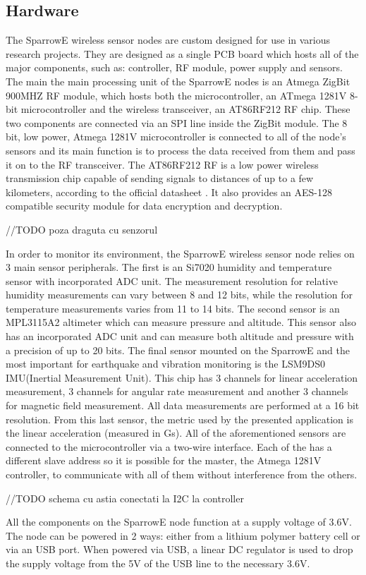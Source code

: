 \label{chap:arch}
\subsection{Hardware}

The SparrowE wireless sensor nodes are custom designed for use in various research projects.
They are designed as a single PCB board which hosts all of the major components, such as: controller,
RF module, power supply and sensors. The main the main processing unit of the SparrowE nodes is an Atmega 
ZigBit 900MHZ RF module, which hosts both the microcontroller, an ATmega 1281V 8-bit microcontroller and the 
wireless transceiver, an AT86RF212 RF chip. These two components are connected via an SPI line inside the ZigBit 
module. The 8 bit, low power, Atmega 1281V microcontroller is connected to all of the node's sensors and its 
main function is to process the data received from them and pass it on to the RF transceiver. The AT86RF212 RF 
is a low power wireless transmission chip capable of sending signals to distances of up to a few kilometers, according 
to the official datasheet \cite{datasheetatmel}. It also provides an AES-128 compatible security module for data 
encryption and decryption.

//TODO poza draguta cu senzorul

In order to monitor its environment, the SparrowE wireless sensor node relies on 3 main sensor peripherals. The first is 
an Si7020 humidity and temperature sensor with incorporated ADC unit. The measurement resolution for relative humidity measurements
can vary between 8 and 12 bits, while the resolution for temperature measurements varies from 11 to 14 bits. The second sensor is 
an MPL3115A2 altimeter which can measure pressure and altitude. This sensor also has an incorporated ADC unit and can measure 
both altitude and pressure with a precision of up to 20 bits. The final sensor mounted on the SparrowE and the most important for 
earthquake and vibration monitoring is the LSM9DS0 IMU(Inertial Measurement Unit). This chip has 3 channels for linear acceleration measurement, 
3 channels for angular rate measurement and another 3 channels for magnetic field measurement. All data measurements are performed at a 
16 bit resolution. From this last sensor, the metric used by the presented application is the linear acceleration (measured in Gs).
All of the aforementioned sensors are connected to the microcontroller via a two-wire interface. Each of the has a different slave address so 
it is possible for the master, the Atmega 1281V controller, to communicate with all of them without interference from the others.

//TODO schema cu astia conectati la I2C la controller

All the components on the SparrowE node function at a supply voltage of 3.6V. The node can be powered in 2 ways: either from a lithium polymer battery 
cell or via an USB port. When powered via USB, a linear DC regulator is used to drop the supply voltage from the 5V of the USB line to the necessary 3.6V.

